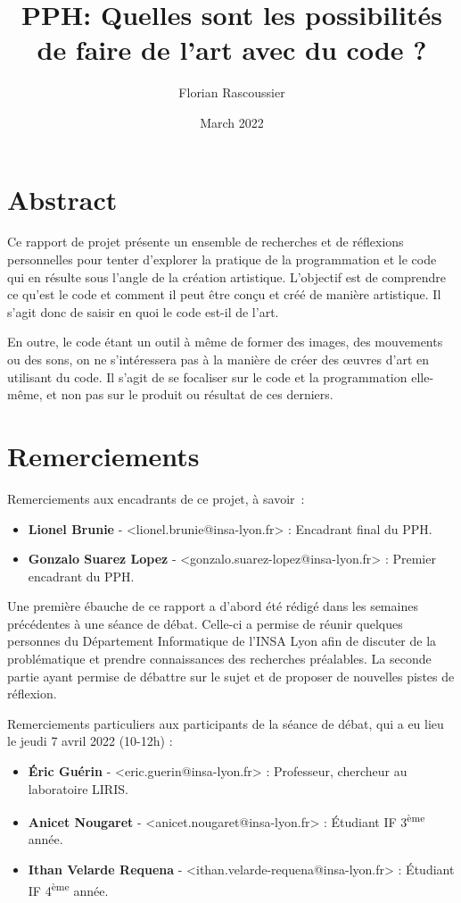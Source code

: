 \documentclass[12pt]{article} %
\title{PPH: Quelles sont les possibilités de faire de l'art avec du code ?}
\author{Florian Rascoussier}
\date{March 2022}
\newcommand{\ts}{\textsuperscript} %
\begin{document}

\newpage


\newpage

\section*{Abstract}
Ce rapport de projet présente un ensemble de recherches et de réflexions personnelles pour tenter d'explorer la pratique de la programmation et le code qui en résulte sous l'angle de la création artistique. L'objectif est de comprendre ce qu'est le code et comment il peut être conçu et créé de manière artistique. Il s'agit donc de saisir en quoi le code est-il de l'art.

En outre, le code étant un outil à même de former des images, des mouvements ou des sons, on ne s'intéressera pas à la manière de créer des œuvres d'art en utilisant du code. Il s'agit de se focaliser sur le code et la programmation elle-même, et non pas sur le produit ou résultat de ces derniers.

\section*{Remerciements}
Remerciements aux encadrants de ce projet, à savoir :

\begin{itemize}
    \item \textbf{Lionel Brunie} - <lionel.brunie@insa-lyon.fr> : Encadrant final  du PPH.
    \item \textbf{Gonzalo Suarez Lopez} - <gonzalo.suarez-lopez@insa-lyon.fr> : Premier encadrant du PPH.
\end{itemize}

Une première ébauche de ce rapport a d'abord été rédigé dans les semaines précédentes à une séance de débat. Celle-ci a permise de réunir quelques personnes du Département Informatique de l'INSA Lyon afin de discuter de la problématique et prendre connaissances des recherches préalables. La seconde partie ayant permise de débattre sur le sujet et de proposer de nouvelles pistes de réflexion.

Remerciements particuliers aux participants de la séance de débat, qui a eu lieu le jeudi 7 avril 2022 (10-12h) :

\begin{itemize}
    \item \textbf{Éric Guérin} - <eric.guerin@insa-lyon.fr> : Professeur, chercheur au laboratoire LIRIS.
    \item \textbf{Anicet Nougaret} - <anicet.nougaret@insa-lyon.fr> : Étudiant IF 3\ts{ème} année. 
    \item \textbf{Ithan Velarde Requena} - <ithan.velarde-requena@insa-lyon.fr> : Étudiant IF 4\ts{ème} année.
\end{itemize}
\end{document}
